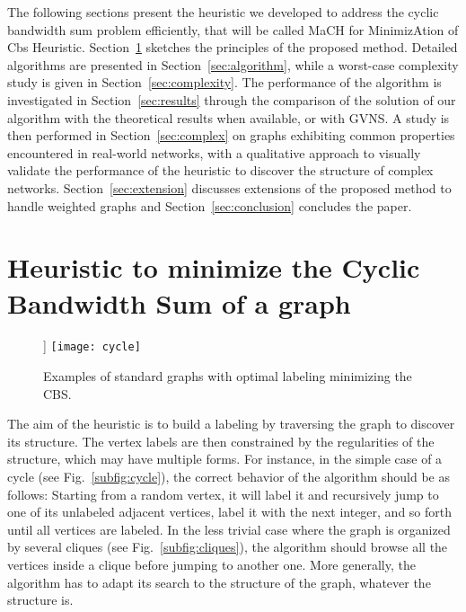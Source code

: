 \documentclass{scrartcl}
\theoremstyle{plain}
\newcommand{\algolong}{MinimizAtion of Cbs Heuristic}
\newcommand{\algo}{MaCH}
\newcommand{\gvns}{GVNS}
\begin{document}
The following sections present the heuristic we developed to address the cyclic 
bandwidth sum problem efficiently, that will be called \algo{} for \algolong{}. 
Section~\ref{sec:proposed_method} sketches the principles of the proposed 
method. Detailed algorithms are presented in Section~\ref{sec:algorithm}, while 
a worst-case complexity study is given in Section~\ref{sec:complexity}. The 
performance of the algorithm is investigated in Section~\ref{sec:results} 
through the comparison of the solution of our algorithm with the theoretical 
results when available, or with \gvns{}. A study is then performed in 
Section~\ref{sec:complex} on graphs exhibiting common properties encountered in 
real-world networks, with a qualitative approach to visually validate the 
performance of the heuristic to discover the structure of complex networks. 
Section~\ref{sec:extension} discusses extensions of the proposed method to 
handle weighted graphs and Section~\ref{sec:conclusion} concludes the paper. 
\makeatletter{}\section{Heuristic to minimize the Cyclic Bandwidth Sum of a graph}
\label{sec:proposed_method}


\begin{figure}[htp]
  \centering
	 ]{
		 \texttt{[image: cycle]}
	}
	
	
\caption{\label{fig:examples}Examples of standard graphs with optimal     
labeling minimizing the CBS.}
\end{figure}

The aim of the heuristic is to build a labeling by traversing the graph to 
discover its structure. The vertex labels are then constrained by the 
regularities of the structure, which may have multiple forms. For instance, in 
the simple case of a cycle (see Fig.~\ref{subfig:cycle}), the correct behavior 
of the algorithm should be as follows: Starting from a random vertex, it will 
label it and recursively jump to one of its unlabeled adjacent vertices, label 
it with the next integer, and so forth until all vertices are labeled. In the 
less trivial case where the graph is organized by several cliques (see 
Fig.~\ref{subfig:cliques}), the algorithm should browse all the vertices inside 
a clique before jumping to another one. More generally, the algorithm has to 
adapt its search to the structure of the graph, whatever the structure is.
\end{document}

